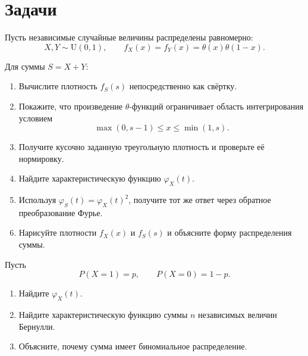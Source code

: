 \documentclass[
  russian,
  11pt,
  a4paper,
  open=any]{scrbook}
\providecommand{\tightlist}{%
  \setlength{\itemsep}{0pt}\setlength{\parskip}{0pt}}
\begin{document}
\section{Задачи}\label{ux437ux430ux434ux430ux447ux438-2}

\begin{semanticpdfbox}[colback=BookCoralSoft,borderline west={1.2mm}{0pt}{BookCoral}]

\par\nopagebreak[4]\vspace{1.2mm}

Пусть независимые случайные величины распределены равномерно: \[
X,Y\sim\mathrm{U}(0,1),
\qquad
f_X(x)=f_Y(x)=\theta(x)\theta(1-x).
\]

Для суммы \(S=X+Y\):

\begin{enumerate}
\def\labelenumi{\arabic{enumi}.}
\tightlist
\item
  Вычислите плотность \(f_S(s)\) непосредственно как свёртку.
\item
  Покажите, что произведение \(\theta\)-функций ограничивает область
  интегрирования условием \[
  \max(0,s-1)\le x\le\min(1,s).
  \]
\item
  Получите кусочно заданную треугольную плотность и проверьте её
  нормировку.
\item
  Найдите характеристическую функцию \(\varphi_X(t)\).
\item
  Используя \(\varphi_S(t)=\varphi_X(t)^2\), получите тот же ответ через
  обратное преобразование Фурье.
\item
  Нарисуйте плотности \(f_X(x)\) и \(f_S(s)\) и объясните форму
  распределения суммы.
\end{enumerate}

\end{semanticpdfbox}

\begin{semanticpdfbox}[colback=BookCoralSoft,borderline west={1.2mm}{0pt}{BookCoral}]

\par\nopagebreak[4]\vspace{1.2mm}

Пусть \[
P(X=1)=p,\qquad P(X=0)=1-p.
\]

\begin{enumerate}
\def\labelenumi{\arabic{enumi}.}
\tightlist
\item
  Найдите \(\varphi_X(t)\).
\item
  Найдите характеристическую функцию суммы \(n\) независимых величин
  Бернулли.
\item
  Объясните, почему сумма имеет биномиальное распределение.
\end{enumerate}

\end{semanticpdfbox}
\end{document}
